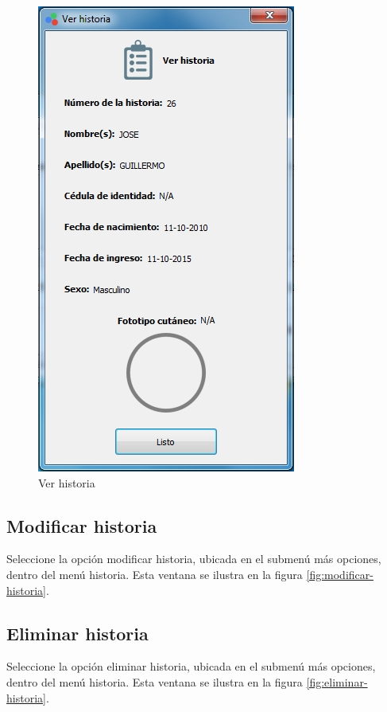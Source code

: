 \begin{figure}[H]
  \centering
  \includegraphics[width=.5\linewidth]{./img/ver-historia1.jpg}
\caption[]{Ver historia\label{fig:ver-historia}}
\end{figure}
\newpage
	\subsection*{Modificar historia}
	
	Seleccione la opci\'{o}n modificar historia, ubicada en el submen\'{u} m\'{a}s opciones, dentro del men\'{u} historia. Esta ventana se ilustra en la figura \ref{fig:modificar-historia}.
	
	\subsection*{Eliminar historia}
	
	Seleccione la opci\'{o}n eliminar historia, ubicada en el submen\'{u} m\'{a}s opciones, dentro del men\'{u} historia. Esta ventana se ilustra en la figura \ref{fig:eliminar-historia}.
	

